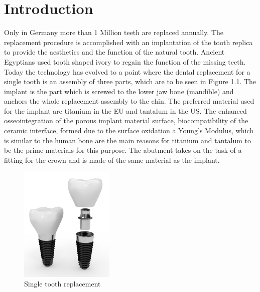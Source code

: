 \cleardoublepage
{}


\chapter{Introduction}
\label{sec:problemstellung}
 Only in Germany more than 1 Million teeth are replaced annually. The replacement procedure is accomplished with an implantation of the tooth replica to provide the aesthetics and the function of the natural tooth. Ancient Egyptians used tooth shaped ivory to regain the function of the missing teeth. Today the technology has evolved to a point where the dental replacement for a single tooth is an assembly of three parts, which  are to be seen in Figure 1.1. The implant is the part which is screwed to the lower jaw bone (mandible) and anchors the whole replacement assembly to the chin. The preferred material used for the implant are titanium in the EU and tantalum in the US. The enhanced osseointegration of the porous implant material surface, biocompatibility of the ceramic interface, formed due to the surface oxidation a Young's Modulus, which is similar to the human bone are the main reasons for titanium and tantalum to be the prime materials for this purpose. The abutment takes on the task of a fitting  for the crown and is made of the same material as the implant.
  \begin{figure}[h]
 	\centering
 	\includegraphics[width=0.4\textwidth]{grafiken/implant.png}
 	\caption{Single tooth replacement}
 	\label{fig:implant}
 \end{figure} 
 
